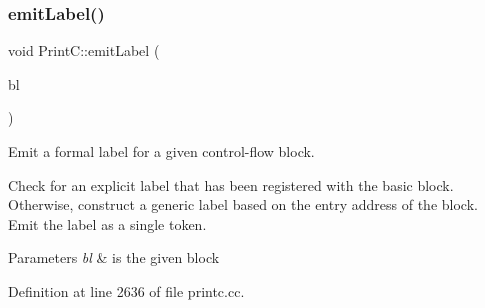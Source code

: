 \subsubsection{\texorpdfstring{emitLabel()}{emitLabel()}}
{\footnotesize\ttfamily void Print\+C\+::emit\+Label (\begin{DoxyParamCaption}\item[{const \mbox{\hyperlink{class_flow_block}{Flow\+Block}} $\ast$}]{bl }\end{DoxyParamCaption})\hspace{0.3cm}{\ttfamily [protected]}}



Emit a formal label for a given control-\/flow block. 

Check for an explicit label that has been registered with the basic block. Otherwise, construct a generic label based on the entry address of the block. Emit the label as a single token. 
\begin{DoxyParams}{Parameters}
{\em bl} & is the given block \\
\hline
\end{DoxyParams}


Definition at line 2636 of file printc.\+cc.

